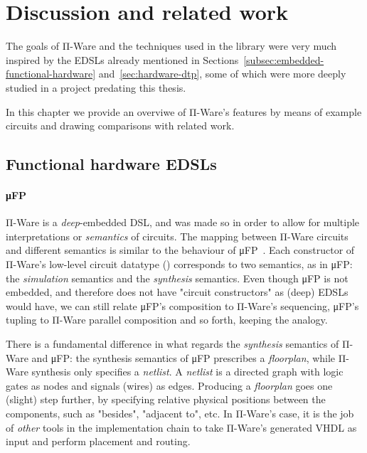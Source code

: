 \chapter{Discussion and related work}
\label{chap:discussion-related-work}

    The goals of Π-Ware and the techniques used in the library were very much inspired by the
    \acp{EDSL} already mentioned in Sections~\ref{subsec:embedded-functional-hardware}
    and~\ref{sec:hardware-dtp}, some of which were more deeply studied in a project
    predating this thesis.

    In this chapter we provide an overviwe of Π-Ware's features by means of example circuits and
    drawing comparisons with related work.

    \section{Functional hardware \acp{EDSL}}
    \label{sec:discussion-functional}

        \subsubsection{μFP}
        \label{subsubsec:discussion-mufp}
        Π-Ware is a \emph{deep}-embedded \ac{DSL}, and was made so in order to allow for multiple
        interpretations or \emph{semantics} of circuits.
        The mapping between Π-Ware circuits and different semantics is similar to the behaviour
        of μFP~\cite{mufp-1984}.
        Each constructor of Π-Ware's low-level circuit datatype () corresponds to two
        semantics, as in μFP: the \emph{simulation} semantics and the \emph{synthesis} semantics.
        Even though μFP is not embedded, and therefore does not have "circuit constructors" as
        (deep) \acp{EDSL} would have, we can still relate μFP's composition to Π-Ware's sequencing,
        μFP's tupling to Π-Ware parallel composition and so forth, keeping the analogy.

        There is a fundamental difference in what regards the \emph{synthesis} semantics of Π-Ware
        and μFP: the synthesis semantics of μFP prescribes a \emph{floorplan}, while Π-Ware synthesis
        only specifies a \emph{netlist}.
        A \emph{netlist} is a directed graph with logic gates as nodes and signals (wires) as edges.
        Producing a \emph{floorplan} goes one (slight) step further, by specifying relative
        physical positions between the components, such as "besides", "adjacent to", etc.
        In Π-Ware's case, it is the job of \emph{other} tools in the implementation chain to take
        Π-Ware's generated \ac{VHDL} as input and perform placement and routing.

